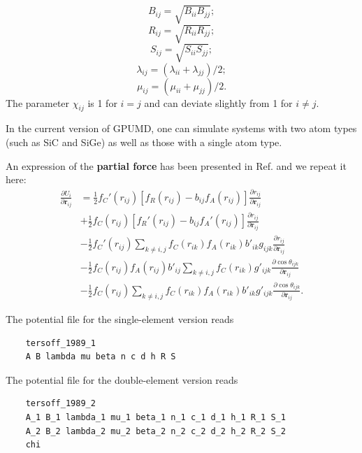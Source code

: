 \documentclass[12pt,a4paper]{report}
\newcommand{\vect}[1]{\boldsymbol{#1}}
\begin{document}
\begin{equation}
B_{ij} =  \sqrt{B_{ii} B_{jj}};
\end{equation}
\begin{equation}
R_{ij} =  \sqrt{R_{ii} R_{jj}};
\end{equation}
\begin{equation}
S_{ij} =  \sqrt{S_{ii} S_{jj}};
\end{equation}
\begin{equation}
\lambda_{ij} =  (\lambda_{ii} + \lambda_{jj})/2;
\end{equation}
\begin{equation}
\mu_{ij} =  (\mu_{ii} + \mu_{jj})/2.
\end{equation}
The parameter $\chi_{ij}$ is 1 for $i=j$ and can deviate slightly from 1 for $i \neq j$.

In the current version of GPUMD, one can simulate systems with two atom types (such as SiC and SiGe) as well as those with a single atom type.

An expression of the \textbf{partial force} has been presented in Ref. \cite{fan2015prb} and we repeat it here:
\begin{align}
\frac{\partial U_i}{\partial \vect{r}_{ij}}
&= \frac{1}{2}f_C'(r_{ij})[f_R(r_{ij})-b_{ij}f_A(r_{ij})]\frac{\partial r_{ij}}{\partial \vect{r}_{ij}} \nonumber \\
&+ \frac{1}{2}f_C(r_{ij})[f_R'(r_{ij})-b_{ij}f_A'(r_{ij})]\frac{\partial r_{ij}}{\partial \vect{r}_{ij}} \nonumber \\
&- \frac{1}{2}f_C'(r_{ij})\sum_{k\neq i,j}f_C(r_{ik})f_A(r_{ik})b'_{ik}g_{ijk} \frac{\partial r_{ij}}{\partial \vect{r}_{ij}} \nonumber \\
&- \frac{1}{2}f_C(r_{ij})f_A(r_{ij})b'_{ij}\sum_{k\neq i,j}f_C(r_{ik})  g'_{ijk}
   \frac{\partial \cos\theta_{ijk}}{\partial \vect{r}_{ij}} \nonumber \\
&- \frac{1}{2}f_C(r_{ij})\sum_{k\neq i,j}f_C(r_{ik})f_A(r_{ik})b'_{ik}  g'_{ijk}
   \frac{\partial \cos\theta_{ijk}}{\partial \vect{r}_{ij}}.
\end{align}


The potential file for the single-element version reads
\begin{verbatim}
    tersoff_1989_1
    A B lambda mu beta n c d h R S
\end{verbatim}
The potential file for the double-element version reads
\begin{verbatim}
    tersoff_1989_2
    A_1 B_1 lambda_1 mu_1 beta_1 n_1 c_1 d_1 h_1 R_1 S_1
    A_2 B_2 lambda_2 mu_2 beta_2 n_2 c_2 d_2 h_2 R_2 S_2
    chi
\end{verbatim}
\end{document}
